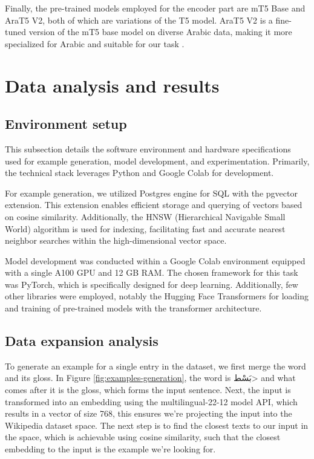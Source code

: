 \documentclass[15pt]{article}
\begin{document}
Finally, the pre-trained models employed for the encoder part are mT5 Base and AraT5 V2, both of which are variations of the T5 model. AraT5 V2 is a fine-tuned version of the mT5 base model on diverse Arabic data, making it more specialized for Arabic and suitable for our task \cite{Nagoudi2021}.

\newpage

\section{Data analysis and results}

\subsection{Environment setup}

This subsection details the software environment and hardware specifications used for example generation, model development, and experimentation. Primarily, the technical stack leverages Python and Google Colab for development.

For example generation, we utilized Postgres engine for SQL with the pgvector extension. This extension enables efficient storage and querying of vectors based on cosine similarity. Additionally, the HNSW (Hierarchical Navigable Small World) algorithm is used for indexing, facilitating fast and accurate nearest neighbor searches within the high-dimensional vector space.

Model development was conducted within a Google Colab environment equipped with a single A100 GPU and 12 GB RAM. The chosen framework for this task was PyTorch, which is specifically designed for deep learning. Additionally, few other libraries were employed, notably the Hugging Face Transformers for loading and training of pre-trained models with the transformer architecture.

\subsection{Data expansion analysis}

To generate an example for a single entry in the dataset, we first merge the word and its gloss. In Figure \ref{fig:examples-generation}, the word is \<بَسْط> and what comes after it is the gloss, which forms the input sentence. Next, the input is transformed into an embedding using the multilingual-22-12 model API, which results in a vector of size 768, this ensures we’re projecting the input into the Wikipedia dataset space. The next step is to find the closest texts to our input in the space, which is achievable using cosine similarity, such that the closest embedding to the input is the example we’re looking for.
\end{document}

